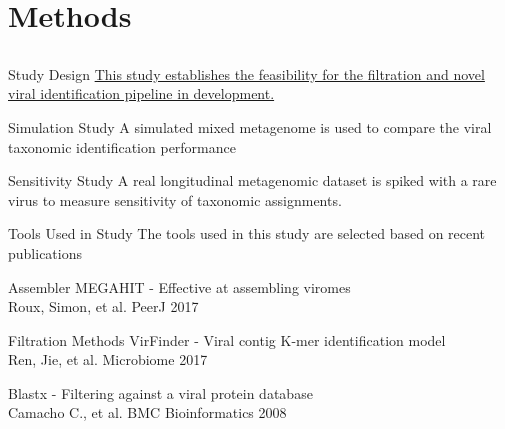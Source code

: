 \documentclass[11pt]{beamer}
\begin{document}
\section{Methods}
\subsection{}
	
	\begin{frame}{Study Design}
	\hyperlink{https://github.com/glickmac/Novel_Viral_Discovery}{This study establishes the feasibility for the filtration and novel viral identification pipeline in development.}
	
	\begin{block}{Simulation Study}
	A simulated mixed metagenome is used to compare the viral taxonomic identification performance
	\end{block}
	
	\begin{block}{Sensitivity Study}
	A real longitudinal metagenomic dataset is spiked with a rare virus to measure sensitivity of taxonomic assignments. 
	\end{block}
	
	\end{frame}
	
	
	\begin{frame}{Tools Used in Study}
	The tools used in this study are selected based on recent publications
	\begin{block}{Assembler}
	MEGAHIT - Effective at assembling viromes \\
	\tiny{Roux, Simon, et al. PeerJ 2017}
	\end{block}
	
	\begin{block}{Filtration Methods}
	VirFinder - Viral contig K-mer identification model \\ 
	\tiny{Ren, Jie, et al. Microbiome 2017}
	
	\large{Blastx - Filtering against a viral protein database} \\
	\tiny{Camacho C., et al. BMC Bioinformatics 2008}
	\end{block}
	
	\end{frame}
	
\end{document}

